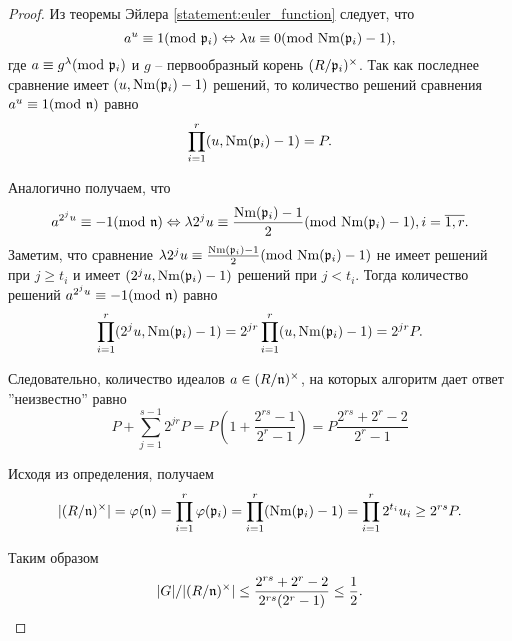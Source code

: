 \documentclass[_dissertation.tex]{subfiles}
\begin{document}
\begin{proof}
    Из теоремы Эйлера \ref{statement:euler_function} следует, что
    \begin{equation*}
        a^u \equiv 1(\textrm{mod } \mathfrak{p}_i)
        \Leftrightarrow
        \lambda u \equiv 0(\textrm{mod } \textrm{Nm}(\mathfrak{p}_i) - 1),
    \end{equation*}
    где $a \equiv g^\lambda(\textrm{mod } \mathfrak{p}_i)$ и $g$ -- первообразный корень $(R/\mathfrak{p}_i)^{\times}$.
    Так как последнее сравнение имеет $(u, \textrm{Nm}(\mathfrak{p}_i) - 1)$ решений, то количество решений сравнения $a^u \equiv 1(\textrm{mod } \mathfrak{n})$ равно
    \begin{equation*}
        \prod_{i=1}^r (u, \textrm{Nm}(\mathfrak{p}_i) - 1) = P.
    \end{equation*}

    Аналогично получаем, что
    \begin{equation*}
        a^{2^j u} \equiv -1(\textrm{mod } \mathfrak{n})
        \Leftrightarrow
        \lambda 2^j u \equiv \frac{\textrm{Nm}(\mathfrak{p}_i) - 1}{2}(\textrm{mod } \textrm{Nm}(\mathfrak{p}_i) - 1), i=\overline{1, r}.
    \end{equation*}
    Заметим, что сравнение $\lambda 2^j u \equiv \frac{\textrm{Nm}(\mathfrak{p}_i) - 1}{2}(\textrm{mod } \textrm{Nm}(\mathfrak{p}_i) - 1)$ не имеет решений при $j \ge t_i$ и имеет $(2^j u, \textrm{Nm}(\mathfrak{p}_i) - 1)$ решений при $j < t_i$.
    Тогда количество решений $a^{2^j u} \equiv -1(\textrm{mod } \mathfrak{n})$ равно
    \begin{equation*}
        \prod_{i=1}^r (2^j u, \textrm{Nm}(\mathfrak{p}_i) - 1) = 2^{jr} \prod_{i=1}^r (u, \textrm{Nm}(\mathfrak{p}_i) - 1) = 2^{jr} P.
    \end{equation*}

    Следовательно, количество идеалов $a \in(R/\mathfrak{n})^{\times}$, на которых алгоритм дает ответ ''неизвестно'' равно
    \begin{equation*}
        P + \sum_{j=1}^{s-1} 2^{jr} P = P\left(1 + \frac{2^{rs} - 1}{2^r - 1}\right) = P\frac{2^{rs} + 2^r - 2}{2^r - 1}
    \end{equation*}

    Исходя из определения, получаем
    \begin{equation*}
        |(R/\mathfrak{n})^{\times}| = \varphi(\mathfrak{n}) = \prod_{i=1}^r \varphi(\mathfrak{p}_i) = \prod_{i=1}^r (\textrm{Nm}(\mathfrak{p}_i) - 1) = \prod_{i=1}^r 2^{t_i} u_i \ge 2^{rs} P.
    \end{equation*}

    Таким образом
    \begin{equation*}
        |G|/|(R/\mathfrak{n})^{\times}| \le \frac{2^{rs} + 2^r - 2}{2^{rs}(2^r - 1)} \le \frac{1}{2}.
    \end{equation*}
\end{proof}
\end{document}
